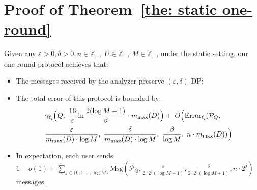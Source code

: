 \section{Proof of Theorem~\ref{the: static one-round}}

\setcounter{theorem}{1}
\begin{theorem}
    Given any $\varepsilon > 0, \delta >0, n \in \mathbb{Z}_+, $ $U \in \mathbb{Z}_{+}$, $M \in \mathbb{Z}_{+}$, under the static setting, our one-round protocol achieves that:

    \begin{itemize}
    \item The messages received by the analyzer preserve $(\varepsilon,\delta)$-DP;
    \item The total error of this protocol is bounded by:
    \[
    \begin{aligned}
    &\mathrm{\gamma}_{\ell_p}\!\Big(
        Q,\;
        \frac{16}{\varepsilon}\ln\frac{2(\log M+1)}{\beta} \cdot m_{\max}(D)
    \Big)
    +\;
    O\Big(\mathrm{Error}_{\ell_p}\!(
        \mathcal{P}_Q,\;    \\
    &
        \frac{\varepsilon}{m_{\max}(D)\cdot \log M},\;
        \frac{\delta}{m_{\max}(D)\cdot \log M},\;
        \frac{\beta}{\log M},\;
        n\cdot m_{\max}(D)
    )\Big)
    \end{aligned}
    \]



    \item In expectation, each user sends $1+o(1)+\sum_{j \in \{0,1,\dots, \log M\}} \allowbreak \mathrm{Msg}(\mathcal{P}_Q, \frac{\varepsilon}{2\cdot 2^j(\log M+1)}, \frac{\delta}{2\cdot 2^j(\log M+1)},n \cdot 2^j)$ messages.

\end{itemize}

\end{theorem}

